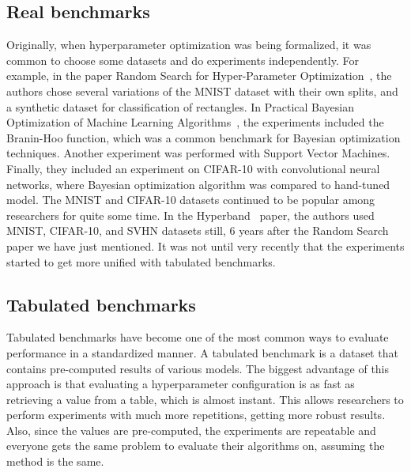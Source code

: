 \subsection{Real benchmarks}
Originally, when hyperparameter optimization was being formalized, it was common to choose some datasets and do experiments independently. For example, in the paper Random Search for Hyper-Parameter Optimization~\cite{bergstra2012random}, the authors chose several variations of the MNIST dataset with their own splits, and a synthetic dataset for classification of rectangles. In Practical Bayesian Optimization of Machine Learning Algorithms~\cite{snoek2012practical}, the experiments included the Branin-Hoo function, which was a common benchmark for Bayesian optimization techniques. Another experiment was performed with Support Vector Machines. Finally, they included an experiment on CIFAR-10 with convolutional neural networks, where Bayesian optimization algorithm was compared to hand-tuned model. The MNIST and CIFAR-10 datasets continued to be popular among researchers for quite some time. In the Hyperband~\cite{li2018hyperband} paper, the authors used MNIST, CIFAR-10, and SVHN datasets still, 6 years after the Random Search paper we have just mentioned. It was not until very recently that the experiments started to get more unified with tabulated benchmarks.

\subsection{Tabulated benchmarks}


Tabulated benchmarks have become one of the most common ways to evaluate performance in a standardized manner. A tabulated benchmark is a dataset that contains pre-computed results of various models. The biggest advantage of this approach is that evaluating a hyperparameter configuration is as fast as retrieving a value from a table, which is almost instant. This allows researchers to perform experiments with much more repetitions, getting more robust results. Also, since the values are pre-computed, the experiments are repeatable and everyone gets the same problem to evaluate their algorithms on, assuming the method is the same.

